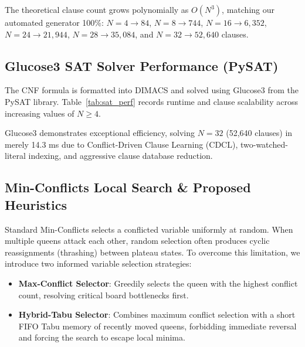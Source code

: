 \documentclass[conference]{IEEEtran}
\begin{document}
The theoretical clause count grows polynomially as $O(N^3)$, matching our automated generator 100\%: $N=4 \to 84$, $N=8 \to 744$, $N=16 \to 6,352$, $N=24 \to 21,944$, $N=28 \to 35,084$, and $N=32 \to 52,640$ clauses.

\subsection{Glucose3 SAT Solver Performance (PySAT)}
The CNF formula is formatted into DIMACS and solved using Glucose3 from the PySAT library. Table~\ref{tab:sat_perf} records runtime and clause scalability across increasing values of $N \ge 4$.

\begin{table}[htbp]
\caption{Glucose3 SAT Solver Scalability ($N \ge 4$)}
\label{tab:sat_perf}
\centering
{}
\end{table}

Glucose3 demonstrates exceptional efficiency, solving $N=32$ (52,640 clauses) in merely 14.3 ms due to Conflict-Driven Clause Learning (CDCL), two-watched-literal indexing, and aggressive clause database reduction.

\subsection{Min-Conflicts Local Search \& Proposed Heuristics}
Standard Min-Conflicts selects a conflicted variable uniformly at random. When multiple queens attack each other, random selection often produces cyclic reassignments (thrashing) between plateau states. To overcome this limitation, we introduce two informed variable selection strategies:
\begin{itemize}
    \item \textbf{Max-Conflict Selector}: Greedily selects the queen with the highest conflict count, resolving critical board bottlenecks first.
    \item \textbf{Hybrid-Tabu Selector}: Combines maximum conflict selection with a short FIFO Tabu memory of recently moved queens, forbidding immediate reversal and forcing the search to escape local minima.
\end{itemize}
\end{document}
